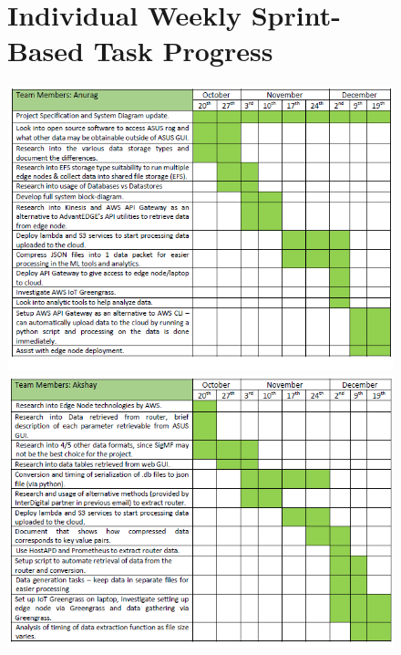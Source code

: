 \begin{figure}[ht]
\section{Individual Weekly Sprint-Based Task Progress}

    \centering
    \includegraphics{images/WBS1.PNG}
    \includegraphics{images/WBS2.PNG}
    \label{fig:WBS1}
\end{figure}

